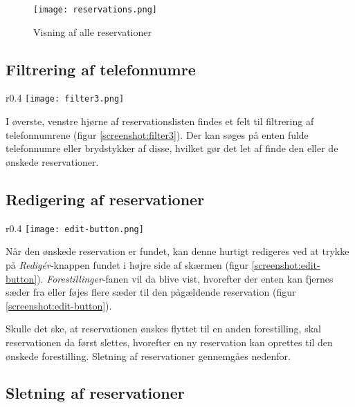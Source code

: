 \begin{figure}[h]
  \centering
  \texttt{[image: reservations.png]}
  \caption{Visning af alle reservationer}
  \label{screenshot:all-reservations}
\end{figure}

\subsection{Filtrering af telefonnumre}

\begin{wrapfigure}[3]{r}{0.4\textwidth}
  \centering
  \vspace{-12pt}
  \texttt{[image: filter3.png]}
  \caption{Filtrering af telefonnumre}
  \label{screenshot:filter3}
\end{wrapfigure}

I øverste, venstre hjørne af reservationslisten findes et felt til filtrering af telefonnumrene (figur \ref{screenshot:filter3}). Der kan søges på enten fulde telefonnumre eller brydstykker af disse, hvilket gør det let af finde den eller de ønskede reservationer.

\subsection{Redigering af reservationer}

\begin{wrapfigure}{r}{0.4\textwidth}
  \centering
  \vspace{-12pt}
  \texttt{[image: edit-button.png]}
  \caption{Mulighed for redigering af reservationer}
  \label{screenshot:edit-button}
\end{wrapfigure}

Når den ønskede reservation er fundet, kan denne hurtigt redigeres ved at trykke på \textit{Redigér}-knappen fundet i højre side af skærmen (figur \ref{screenshot:edit-button}). \textit{Forestillinger}-fanen vil da blive vist, hvorefter der enten kan fjernes sæder fra eller føjes flere sæder til den pågældende reservation (figur \ref{screenshot:edit-button}).

Skulle det ske, at reservationen ønskes flyttet til en anden forestilling, skal reservationen da først slettes, hvorefter en ny reservation kan oprettes til den ønskede forestilling. Sletning af reservationer gennemgåes nedenfor.

\subsection{Sletning af reservationer}

